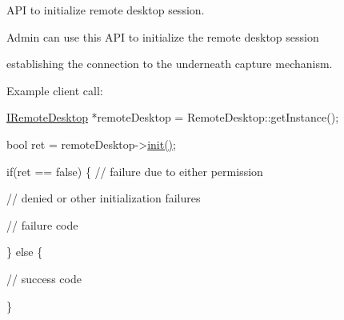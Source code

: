 \-A\-P\-I to initialize remote desktop session. 

\-Admin can use this \-A\-P\-I to initialize the remote desktop session

establishing the connection to the underneath capture mechanism.

\-Example client call\-:


\begin{DoxyPre}\end{DoxyPre}



\begin{DoxyPre}  \hyperlink{classknoxremotedesktop_1_1IRemoteDesktop}{IRemoteDesktop} *remoteDesktop = RemoteDesktop::getInstance();\end{DoxyPre}



\begin{DoxyPre}  bool ret = remoteDesktop->\hyperlink{classknoxremotedesktop_1_1IRemoteDesktop_a7bed40d98c61713a69cf1dad8b37beae}{init()};\end{DoxyPre}



\begin{DoxyPre}  if(ret == false)  \{ // failure due to either permission\end{DoxyPre}



\begin{DoxyPre}                      // denied or other initialization failures\end{DoxyPre}



\begin{DoxyPre}     // failure code\end{DoxyPre}



\begin{DoxyPre}  \} else \{\end{DoxyPre}



\begin{DoxyPre}     // success code\end{DoxyPre}



\begin{DoxyPre}  \}\end{DoxyPre}



\begin{DoxyPre} \end{DoxyPre}


